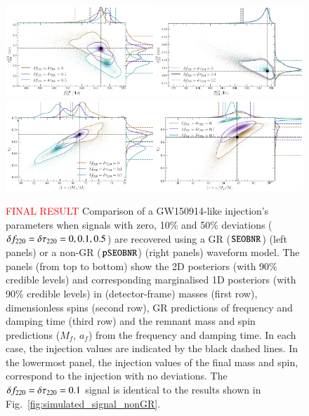 \begin{figure}
        \includegraphics[width=0.5\textwidth]{figures/GW150914_simulated_signal_0p0_0p1_0p5_gr_fgrtaugr.png}\includegraphics[width=0.5\textwidth]{figures/GW150914_simulated_signal_0p0_0p1_0p5_ngr_fgrtaugr.png}
        \includegraphics[width=0.5\textwidth]{figures/GW150914_simulated_signal_0p0_0p1_0p5_gr_Mfaf.png}\includegraphics[width=0.5\textwidth]{figures/GW150914_simulated_signal_0p0_0p1_0p5_ngr_Mfaf.png}
        \caption{\textcolor{red}{FINAL RESULT}  Comparison of a GW150914-like injection's parameters when signals with zero, 10\% and 50\% deviations ($\delta f_{\text{220}} = \delta \tau_{\text{220}} = 0, 0.1, 0.5$) are recovered using a GR ($\texttt{SEOBNR}$) (left panels) or a non-GR ($\texttt{pSEOBNR}$) (right panels) waveform model. The panels (from top to bottom) show the 2D posteriors (with 90\% credible levels) and corresponding marginalised 1D posteriors (with 90\% credible levels) in (detector-frame) masses (first row), dimensionless spins (second row), GR predictions of frequency and damping time (third row) and the remnant mass and spin predictions ($M_f$, $a_f$) from the frequency and damping time. In each case, the injection values are indicated by the black dashed lines. In the lowermost panel, the injection values of the final mass and spin, correspond to the injection with no deviations. The $\delta f_{\text{220}} = \delta \tau_{\text{220}} = 0.1$ signal is identical to the results shown in Fig.~\ref{fig:simulated_signal_nonGR}.}
        \label{fig:gr_ngr_comparison}
\end{figure}


